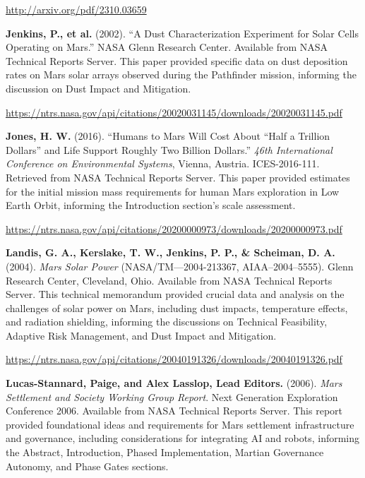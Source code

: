\documentclass[fontsize=10pt, oneside, DIV=calc]{scrartcl}
\begin{document}
\href{http://arxiv.org/pdf/2310.03659}{\url{http://arxiv.org/pdf/2310.03659}}

\vspace{1em}
\noindent \textbf{Jenkins, P., et al.} (2002). ``A Dust Characterization Experiment for Solar Cells Operating on Mars.'' NASA Glenn Research Center. Available from NASA Technical Reports Server. This paper provided specific data on dust deposition rates on Mars solar arrays observed during the Pathfinder mission, informing the discussion on Dust Impact and Mitigation. 



\href{https://ntrs.nasa.gov/api/citations/20020031145/downloads/20020031145.pdf}{\url{https://ntrs.nasa.gov/api/citations/20020031145/downloads/20020031145.pdf}}

\vspace{1em}
\noindent \textbf{Jones, H. W.} (2016). ``Humans to Mars Will Cost About ``Half a Trillion Dollars'' and Life Support Roughly Two Billion Dollars.'' \textit{46th International Conference on Environmental Systems}, Vienna, Austria. ICES-2016-111. Retrieved from NASA Technical Reports Server. This paper provided estimates for the initial mission mass requirements for human Mars exploration in Low Earth Orbit, informing the Introduction section's scale assessment. 



\href{https://ntrs.nasa.gov/api/citations/20200000973/downloads/20200000973.pdf}{\url{https://ntrs.nasa.gov/api/citations/20200000973/downloads/20200000973.pdf}}

\vspace{1em}
\noindent \textbf{Landis, G. A., Kerslake, T. W., Jenkins, P. P., \& Scheiman, D. A.} (2004). \textit{Mars Solar Power} (NASA/TM—2004-213367, AIAA–2004–5555). Glenn Research Center, Cleveland, Ohio. Available from NASA Technical Reports Server. This technical memorandum provided crucial data and analysis on the challenges of solar power on Mars, including dust impacts, temperature effects, and radiation shielding, informing the discussions on Technical Feasibility, Adaptive Risk Management, and Dust Impact and Mitigation. 



\href{https://ntrs.nasa.gov/api/citations/20040191326/downloads/20040191326.pdf}{\url{https://ntrs.nasa.gov/api/citations/20040191326/downloads/20040191326.pdf}}

\vspace{1em}
\noindent \textbf{Lucas-Stannard, Paige, and Alex Lasslop, Lead Editors.} (2006). \textit{Mars Settlement and Society Working Group Report}. Next Generation Exploration Conference 2006. Available from NASA Technical Reports Server. This report provided foundational ideas and requirements for Mars settlement infrastructure and governance, including considerations for integrating AI and robots, informing the Abstract, Introduction, Phased Implementation, Martian Governance Autonomy, and Phase Gates sections. 
\end{document}
